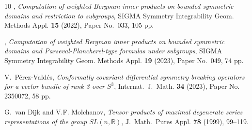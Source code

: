 \documentclass[reqno,11pt]{amsart}
\theoremstyle{remark}
\theoremstyle{definition}
\numberwithin{equation}{section}
\newcommand{\R}{\mathbb{R}}
\begin{document}
\begin{thebibliography}{10}
\bysame, \emph{{Computation of weighted Bergman inner products on bounded
  symmetric domains and restriction to subgroups}}, SIGMA Symmetry
  Integrability Geom. Methods Appl. \textbf{15} (2022), Paper No.\ 033, 105 pp.

\bysame, \emph{{Computation of weighted Bergman inner products on bounded
  symmetric domains and Parseval-Plancherel-type formulas under subgroups}},
  SIGMA Symmetry Integrability Geom. Methods Appl. \textbf{19} (2023), Paper
  No.\ 049, 74 pp.

V.~P{\'e}rez-Vald{\'e}s, \emph{{Conformally covariant differential symmetry
  breaking operators for a vector bundle of rank 3 over $S^3$}}, Internat.\ J.\
  Math. \textbf{34} (2023), Paper No. 2350072, 58 pp.

G.~van Dijk and V.F. Molchanov, \emph{{Tensor products of maximal degenerate
  series representations of the group $SL(n,\R)$}}, J.\ Math.\ Pures Appl.
  \textbf{78} (1999), 99--119.

\end{thebibliography}



\end{document}
